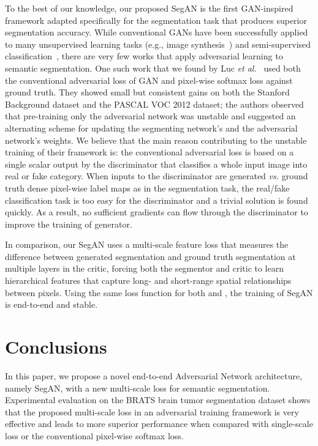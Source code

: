 \documentclass[twocolumn]{svjour3}
\begin{document}
To the best of our knowledge, our proposed SegAN is the first GAN-inspired framework adapted specifically for the segmentation task that produces superior segmentation accuracy.
While conventional GANs have been successfully applied to many unsupervised learning tasks (e.g., image synthesis~\cite{zhang2016stackgan}) and semi-supervised classification~\cite{salimans2016improved}, there are very few works that apply adversarial learning to semantic segmentation. One such work that we found  by Luc \emph{et al.}~\cite{luc2016semantic} used both the conventional adversarial loss of GAN and pixel-wise softmax loss against ground truth.
They showed small but consistent gains on both the Stanford Background dataset and the PASCAL VOC 2012 dataset; the authors observed that pre-training only the adversarial network was unstable and suggested an alternating scheme for updating the segmenting network’s and the adversarial network’s weights.
We believe that the main reason contributing to the unstable training of their framework is: the conventional adversarial loss is based on a single scalar output by the discriminator that classifies a whole input image into real or fake category.
When inputs to the discriminator are generated \emph{vs.} ground truth dense pixel-wise label maps as in the segmentation task, the real/fake classification task is too easy for the discriminator and a trivial solution is found quickly. As a result, no sufficient gradients can flow through the discriminator to improve the training of generator.


In comparison, our SegAN uses a multi-scale feature loss that measures the difference between generated segmentation and ground truth segmentation at multiple layers in the critic, forcing both the segmentor and critic to learn hierarchical features that capture long- and short-range spatial relationships between pixels. Using the same loss function for both  and , the training of SegAN is end-to-end and stable.





\section{Conclusions}
In this paper, we propose a novel end-to-end Adversarial Network architecture, namely SegAN, with a new multi-scale loss for semantic segmentation. Experimental evaluation on the BRATS brain tumor segmentation dataset shows that the proposed multi-scale loss in an adversarial training framework is very effective and leads to more superior performance when compared with single-scale loss or the conventional pixel-wise softmax loss.
\end{document}
